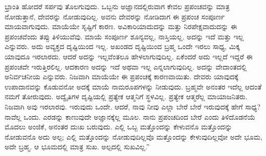 ಭ್ರಾಂತಿ ಹೋದರೆ ಸರ್ಪವು ತೊಲಗುವುದು. ಒಬ್ಬನು ಅಜ್ಞಾನದಲ್ಲಿರುವಾಗ ಕೇವಲ ಪ್ರಪಂಚವನ್ನು ಮಾತ್ರ ನೋಡುತ್ತಾನೆ, ದೇವರನ್ನು ನೋಡುವುದಿಲ್ಲ. ಅವನು ದೇವರನ್ನು ನೋಡಿದಾಗ ಈ ಪ್ರಪಂಚ ಸಂಪೂರ್ಣ ಮಾಯವಾಗುವುದು. ಮಾಯೆಯೇ ಸೃಷ್ಟಿಗೆ ಕಾರಣ. ಅವಿಕಾರಿಯಾದುದನ್ನು ಮತ್ತು ನಿರಪೇಕ್ಷವಾದುದನ್ನು ಈ ಪ್ರಪಂಚವೆಂದು ತಪ್ಪು ತಿಳಿಯುವೆವು. ಮಾಯೆ ಸಂಪೂರ್ಣ ಶೂನ್ಯವಲ್ಲ, ನಾಸ್ತಿಯಲ್ಲ. ಅದನ್ನು ಇದೆ ಮತ್ತು ಇಲ್ಲ ಎನ್ನುವರು. ಅದು ಅವ್ಯಕ್ತದ ದೃಷ್ಟಿಯಿಂದ ಇಲ್ಲ. ಅಖಂಡದ ದೃಷ್ಟಿಯಿಂದ ಬ್ರಹ್ಮ ಒಂದೇ ಇರಲು ಸಾಧ್ಯ, ಮಿಕ್ಕ ಯಾವುದೂ ಇರಲಾರದು. ಆದರೆ ಅದನ್ನು ಇಲ್ಲವೆಂತಲೂ ಹೇಳಲಾಗುವುದಿಲ್ಲ. ಏಕೆಂದರೆ ಅದು ಇಲ್ಲದೆ ಇದ್ದರೆ ಈ ಪ್ರಪಂಚವೇ ಇರುತ್ತಿರಲಿಲ್ಲ. ಆದಕಾರಣ ಅದನ್ನು ಇದೆ ಅಥವಾ ಇಲ್ಲ ಎನ್ನಲಾಗುವುದಿಲ್ಲ. ಅದನ್ನು ವೇದಾಂತದಲ್ಲಿ ಅನಿರ್ವಚನೀಯ ಎನ್ನುವರು. ನಿಜವಾಗಿ ಮಾಯೆಯೇ ಈ ಪ್ರಪಂಚಕ್ಕೆ ಕಾರಣವಾಯಿತು. ದೇವರು ಯಾವುದಕ್ಕೆ ಉಪಾದಾನವನ್ನು ಕೊಡುವನೋ ಅದಕ್ಕೆ ಮಾಯೆ ನಾಮರೂಪಗಳನ್ನು ನೀಡುವುದು. ಬ್ರಹ್ಮವೇ ಅನಂತರ ಇದೆಲ್ಲ ಆದಂತೆ ನಮಗೆ ತೋರುವುದು. ಅದ್ವೈತಿಗಳ ದೃಷ್ಟಿಯಲ್ಲಿ ಪ್ರತ್ಯೇಕ ಆತ್ಮನಿಗೆ ಸ್ಥಳವಿಲ್ಲ. ಪ್ರತ್ಯೇಕ ಆತ್ಮರೆಲ್ಲ ಮಾಯಾಜನಿತರು. ನಿಜವಾಗಿ ಅವು ಇರಲಾರವು. ಇರುವುದು ಒಂದೇ. ಆದರೆ, ನಾವು ನೀವು ಎಲ್ಲಾ ಬೇರೆ ಬೇರೆ ಇರುವುದಕ್ಕೆ ಹೇಗೆ ಸಾಧ್ಯ? ನಾವೆಲ್ಲ ಒಂದು. ಎರಡನ್ನು ಕಾಣುವುದೇ ಅಜ್ಞಾನಕ್ಕೆಲ್ಲ ಮೂಲ. ನಾನು ಪ್ರಪಂಚದಿಂದ ಬೇರೆ ಎಂದು ತಿಳಿದೊಡನೆಯೆ ಮೊದಲು ಅಂಜಿಕೆ, ಅನಂತರ ದುಃಖ ಬರುವುದು. ಎಲ್ಲಿ ಒಬ್ಬ ಮತ್ತೊಂದನ್ನು ಕೇಳುವನೊ ಮತ್ತೊಂದನ್ನು ನೋಡುವನೊ ಅದು ಅಲ್ಪ; ಎಲ್ಲಿ ಮತ್ತೊಂದನ್ನು ನೋಡುವುದಿಲ್ಲವೊ ಮತ್ತೊಂದನ್ನು ಕೇಳುವುದಿಲ್ಲವೋ ಅದೇ ಭೂಮ, ಅದೇ ಬ್ರಹ್ಮ. ಆ ಭೂಮದಲ್ಲಿ ಮಾತ್ರ ಸುಖ. ಅಲ್ಪದಲ್ಲಿ ಸುಖವಿಲ್ಲ.”

